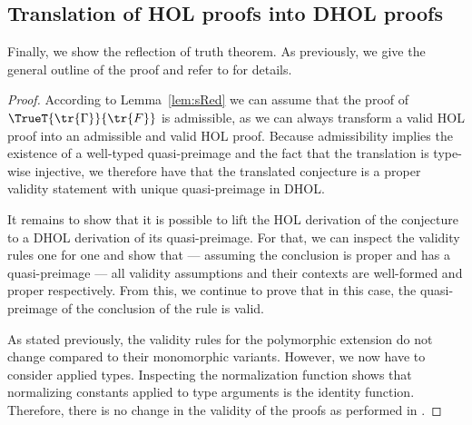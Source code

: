 \subsection{Translation of HOL proofs into DHOL proofs}
Finally, we show the reflection of truth theorem. As previously, we give the
general outline of the proof and refer to \cite{RRB23ext} for details.
\begin{proof}
  According to Lemma~\ref{lem:sRed} we can assume that the proof of \(\TrueT{\tr{\Gamma}}
  {\tr{F}}\) is admissible, as we can always transform a valid HOL proof into an
  admissible and valid HOL proof. Because admissibility implies the existence of a well-typed
  quasi-preimage and the fact that the translation is type-wise injective, we therefore
  have that the translated conjecture is a proper validity statement with unique quasi-preimage
  in DHOL.

  It remains to show that it is possible to lift the HOL derivation of the conjecture to a DHOL
  derivation of its quasi-preimage. For that, we can inspect the validity rules one for one and
  show that --- assuming the conclusion is proper and has a quasi-preimage --- all validity
  assumptions and their contexts are well-formed and proper respectively. From this, we
  continue to prove that in this case, the quasi-preimage of the conclusion of the rule is valid.

  As stated previously, the validity rules for the polymorphic extension do not change compared
  to their monomorphic variants. However, we now have to consider applied types. Inspecting the
  normalization function shows that normalizing constants applied to type arguments is the identity
  function. Therefore, there is no change in the validity of the proofs as performed in
  \cite{RRB23ext}.
\end{proof}

